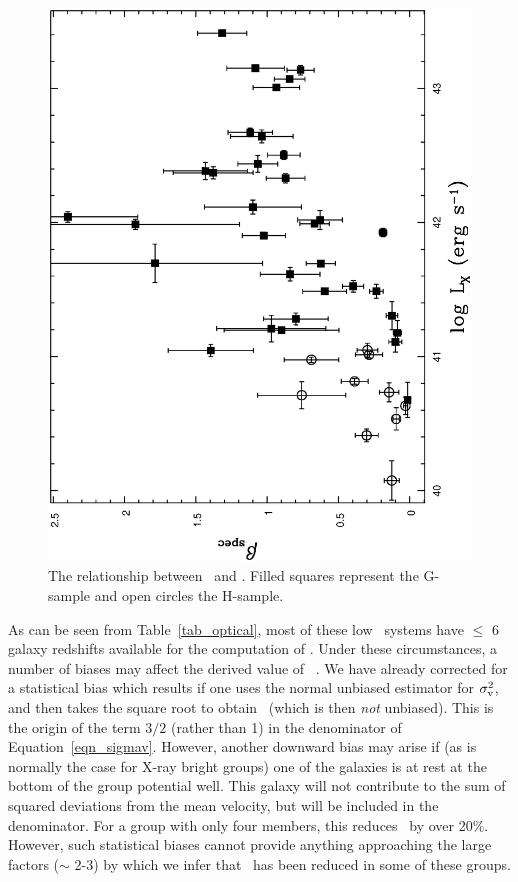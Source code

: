 \documentclass[usenatbib]{mn2e}
\begin{document}
\begin{figure}

  \includegraphics[height=\linewidth,angle=270]{fig_17.ps}
  \caption{The relationship between \betaspec\ and \LX.  Filled squares
           represent the G-sample and open circles the H-sample.}
  \label{fig_betaspec_LX}

\end{figure}

As can be seen from Table~\ref{tab_optical}, most of these low \sigmav\ systems
have $\le$ 6 galaxy redshifts available for the computation of \sigmav.  Under
these circumstances, a number of biases may affect the derived value of \sigmav\
\citep{helsdon04b}.  We have already corrected for a statistical bias which
results if one uses the normal unbiased estimator for $\sigma_{\mathrm{v}}^2$, and then takes
the square root to obtain \sigmav\ (which is then {\it not} unbiased).  This is
the origin of the term $3/2$ (rather than 1) in the denominator of
Equation~\ref{eqn_sigmav}.  However, another downward bias may arise if (as is
normally the case for X-ray bright groups) one of the galaxies is at rest at the
bottom of the group potential well.  This galaxy will not contribute to the sum
of squared deviations from the mean velocity, but will be included in the
denominator.  For a group with only four members, this reduces \sigmav\ by over
20\%.  However, such statistical biases cannot provide anything approaching the
large factors ($\sim$ 2-3) by which we infer that \sigmav\ has been reduced in
some of these groups.
\end{document}
